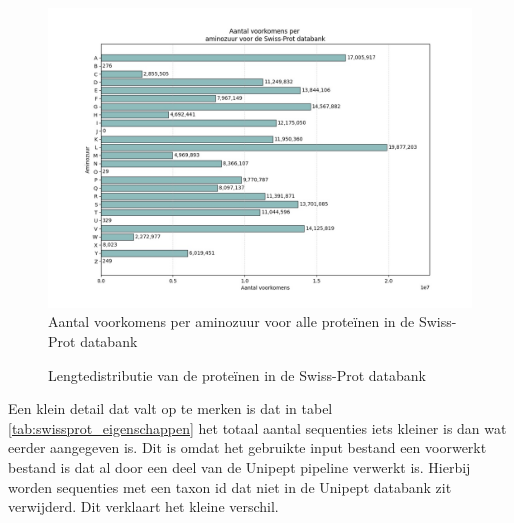\documentclass[11pt,dutch,faculty=we,layout=titlefont,underline=false,titleUppercase=true,titleUnderline=true]{ugent2016-report}
\begin{document}
    \begin{figure}[H]
        \centering
        \includegraphics[width=0.7\linewidth]{swissprot_aminozuur_voorkomens}
        \caption{Aantal voorkomens per aminozuur voor alle proteïnen in de Swiss-Prot databank}
        \label{fig:swissprot_aminozuur}
    \end{figure}

    \begin{figure}[H]
        \centering
        \caption{Lengtedistributie van de proteïnen in de Swiss-Prot databank}\label{fig:swissprot_length}
    \end{figure}

    Een klein detail dat valt op te merken is dat in tabel \ref{tab:swissprot_eigenschappen} het totaal aantal sequenties iets kleiner is dan wat eerder aangegeven is.
    Dit is omdat het gebruikte input bestand een voorwerkt bestand is dat al door een deel van de Unipept pipeline verwerkt is.
    Hierbij worden sequenties met een taxon id dat niet in de Unipept databank zit verwijderd.
    Dit verklaart het kleine verschil.
\end{document}
